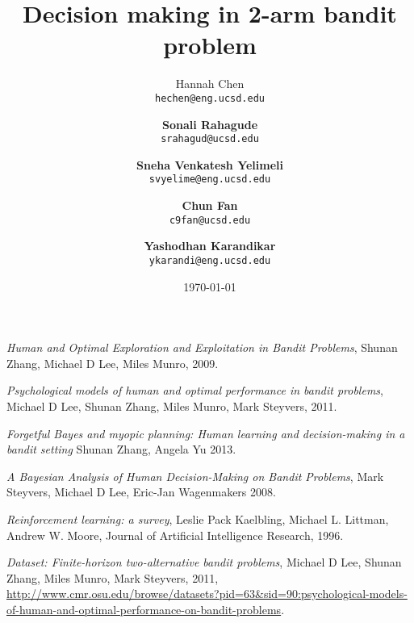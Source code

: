 \documentclass{article} %
\title{Decision making in 2-arm bandit problem}
\author{Hannah Chen \\
  \texttt{hechen@eng.ucsd.edu} \and \textbf{Sonali Rahagude}\\
  \texttt{srahagud@ucsd.edu} \and \textbf{Sneha Venkatesh Yelimeli}\\
  \texttt{svyelime@eng.ucsd.edu} \and \textbf{Chun Fan}\\
  \texttt{c9fan@ucsd.edu} \and \textbf{Yashodhan Karandikar}\\
  \texttt{ykarandi@eng.ucsd.edu}}
\date{\today}
\begin{document}
\maketitle





%

\begin{thebibliography}{9}

	\emph{Human and Optimal Exploration and Exploitation in Bandit Problems},
	Shunan Zhang, Michael D Lee, Miles Munro,
	2009.

  \emph{Psychological models of human and optimal performance in bandit problems},
  Michael D Lee, Shunan Zhang, Miles Munro, Mark Steyvers,
  2011.

 \emph{Forgetful Bayes and myopic planning: Human learning and decision-making in a bandit setting}
  Shunan Zhang, Angela Yu
  2013.

  \emph{A Bayesian Analysis of Human Decision-Making on Bandit Problems},
  Mark Steyvers, Michael D Lee, Eric-Jan Wagenmakers
  2008.
  
	\emph{Reinforcement learning: a survey},
	Leslie Pack	Kaelbling, Michael L. Littman, Andrew W. Moore,
	Journal of Artificial Intelligence Research,
	1996.

  \emph{Dataset: Finite-horizon two-alternative bandit problems},
  Michael D Lee, Shunan Zhang, Miles Munro, Mark Steyvers,
  2011,
  \url{http://www.cmr.osu.edu/browse/datasets?pid=63&sid=90:psychological-models-of-human-and-optimal-performance-on-bandit-problems}.

%
\end{thebibliography}
\end{document}

